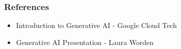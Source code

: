 
\begin{frame}\frametitle{References}
\begin{itemize}
\item Introduction to Generative AI - Google Cloud Tech
\item Generative AI Presentation - Laura Worden
\end{itemize}
\end{frame}